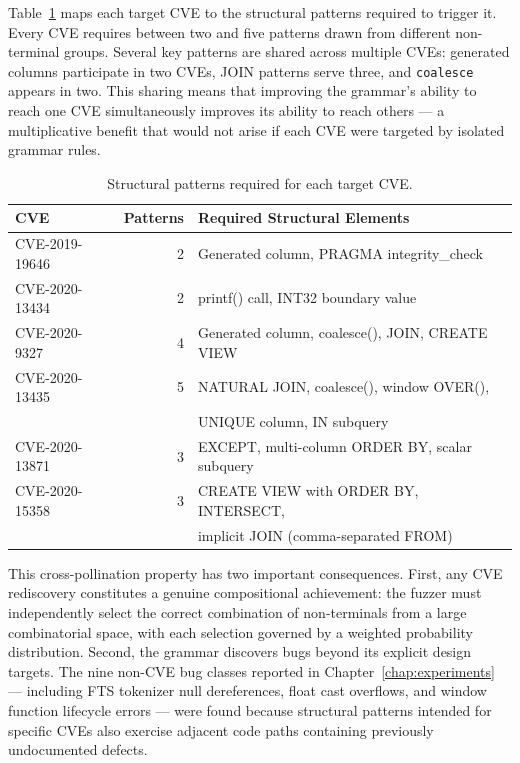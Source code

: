Table~\ref{tab:cve-structural} maps each target CVE to the structural patterns required to trigger it. Every CVE requires between two and five patterns drawn from different non-terminal groups. Several key patterns are shared across multiple CVEs: generated columns participate in two CVEs, JOIN patterns serve three, and \texttt{coalesce} appears in two. This sharing means that improving the grammar's ability to reach one CVE simultaneously improves its ability to reach others --- a multiplicative benefit that would not arise if each CVE were targeted by isolated grammar rules.

\begin{table}[htbp]
\caption{Structural patterns required for each target CVE.}
\label{tab:cve-structural}
\centering
\begin{tabular}{lrl}
\toprule
\textbf{CVE} & \textbf{Patterns} & \textbf{Required Structural Elements} \\
\midrule
CVE-2019-19646 & 2 & Generated column, PRAGMA integrity\_check \\
CVE-2020-13434 & 2 & printf() call, INT32 boundary value \\
CVE-2020-9327  & 4 & Generated column, coalesce(), JOIN, CREATE VIEW \\
CVE-2020-13435 & 5 & NATURAL JOIN, coalesce(), window OVER(), \\
               &   & UNIQUE column, IN subquery \\
CVE-2020-13871 & 3 & EXCEPT, multi-column ORDER BY, scalar subquery \\
CVE-2020-15358 & 3 & CREATE VIEW with ORDER BY, INTERSECT, \\
               &   & implicit JOIN (comma-separated FROM) \\
\bottomrule
\end{tabular}
\end{table}

This cross-pollination property has two important consequences. First, any CVE rediscovery constitutes a genuine compositional achievement: the fuzzer must independently select the correct combination of non-terminals from a large combinatorial space, with each selection governed by a weighted probability distribution. Second, the grammar discovers bugs beyond its explicit design targets. The nine non-CVE bug classes reported in Chapter~\ref{chap:experiments} --- including FTS tokenizer null dereferences, float cast overflows, and window function lifecycle errors --- were found because structural patterns intended for specific CVEs also exercise adjacent code paths containing previously undocumented defects.


